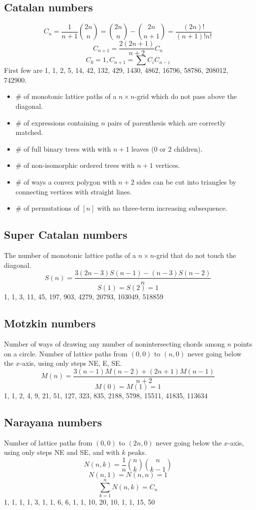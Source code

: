 	\subsection{Catalan numbers}
		$$C_n=\frac{1}{n+1}\binom{2n}{n}= \binom{2n}{n}-\binom{2n}{n+1} = \frac{(2n)!}{(n+1)!n!}$$
		$$C_{n+1} = \frac{2(2n+1)}{n+2}C_n$$
		$$C_0=1, C_{n+1}=\sum C_iC_{n-i}$$
		First few are 1, 1, 2, 5, 14, 42, 132, 429, 1430, 4862, 16796, 58786, 208012, 742900.
		\begin{itemize}
			\setlength\itemsep{0pt}
			\item \# of monotonic lattice paths of a $n\times n$-grid which do not pass above the diagonal.
			\item \# of expressions containing $n$ pairs of parenthesis which are correctly matched.
			\item \# of full binary trees with with $n+1$ leaves (0 or 2 children).
			\item \# of non-isomorphic ordered trees with $n+1$ vertices.
			\item \# of ways a convex polygon with $n+2$ sides can be cut into triangles by connecting vertices with straight lines.
			\item \# of permutations of $[n]$ with no three-term increasing subsequence.
		\end{itemize}

	\subsection{Super Catalan numbers}
		The number of monotonic lattice paths of a $n\times n$-grid that do not touch the diagonal.
		$$S(n) = \frac{3(2n-3)S(n-1)-(n-3)S(n-2)}{n}$$
		$$S(1)=S(2)=1$$
		1, 1, 3, 11, 45, 197, 903, 4279, 20793, 103049, 518859

	\subsection{Motzkin numbers}
		Number of ways of drawing any number of nonintersecting chords among $n$ points on a circle. Number of lattice paths from $(0,0)$ to $(n,0)$ never going below the $x$-axis, using only steps NE, E, SE.
		$$M(n) = \frac{3(n-1)M(n-2)+(2n+1)M(n-1)}{n+2}$$
		$$M(0) = M(1) = 1$$
		1, 1, 2, 4, 9, 21, 51, 127, 323, 835, 2188, 5798, 15511, 41835, 113634

	\subsection{Narayana numbers}
		Number of lattice paths from $(0,0)$ to $(2n,0)$ never going below the $x$-axis, using only steps NE and SE, and with $k$ peaks.
		$$N(n,k) = \frac{1}{n}\binom{n}{k}\binom{n}{k-1}$$
		$$N(n,1) = N(n,n) = 1$$
		$$\sum_{k=1}^n N(n,k) = C_n$$
		1, 1, 1, 1, 3, 1, 1, 6, 6, 1, 1, 10, 20, 10, 1, 1, 15, 50

